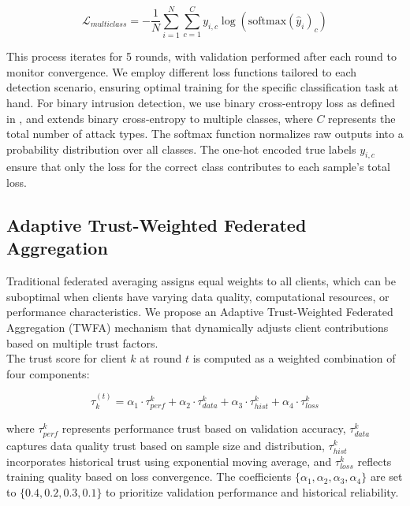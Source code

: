 \begin{equation}
	\label{equation:multiclass-loss}
	\mathcal{L}_{multiclass} = -\frac{1}{N}\sum_{i=1}^{N}\sum_{c=1}^{C}y_{i,c}\log(\text{softmax}(\hat{y}_i)_c)
\end{equation}

This process iterates for 5 rounds, with validation performed after each round to monitor convergence. We employ different loss functions tailored to each detection scenario, ensuring optimal training for the specific classification task at hand. For binary intrusion detection, we use binary cross-entropy loss as defined in , and  extends binary cross-entropy to multiple classes, where $C$ represents the total number of attack types. The softmax function normalizes raw outputs into a probability distribution over all classes. The one-hot encoded true labels $y_{i,c}$ ensure that only the loss for the correct class contributes to each sample's total loss.

\subsection{Adaptive Trust-Weighted Federated Aggregation}
\label{subsection:trust-weighted-aggregation}
Traditional federated averaging assigns equal weights to all clients, which can be suboptimal when clients have varying data quality, computational resources, or performance characteristics. We propose an Adaptive Trust-Weighted Federated Aggregation (TWFA) mechanism that dynamically adjusts client contributions based on multiple trust factors. \\

The trust score for client $k$ at round $t$ is computed as a weighted combination of four components:

\begin{equation}
	\label{equation:trust-score}
	\tau_k^{(t)} = \alpha_1 \cdot \tau_{perf}^k + \alpha_2 \cdot \tau_{data}^k + \alpha_3 \cdot \tau_{hist}^k + \alpha_4 \cdot \tau_{loss}^k
\end{equation}

where $\tau_{perf}^k$ represents performance trust based on validation accuracy, $\tau_{data}^k$ captures data quality trust based on sample size and distribution, $\tau_{hist}^k$ incorporates historical trust using exponential moving average, and $\tau_{loss}^k$ reflects training quality based on loss convergence. The coefficients $\{\alpha_1, \alpha_2, \alpha_3, \alpha_4\}$ are set to $\{0.4, 0.2, 0.3, 0.1\}$ to prioritize validation performance and historical reliability. \\

